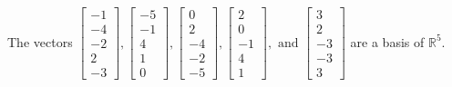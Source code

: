 \begin{exercise}
\begin{exerciseStatement}
  \end{exerciseStatement}
  \begin{exerciseAnswer}
   The vectors \(\left[\begin{array}{r}
-1 \\
-4 \\
-2 \\
2 \\
-3
\end{array}\right] , \left[\begin{array}{r}
-5 \\
-1 \\
4 \\
1 \\
0
\end{array}\right] , \left[\begin{array}{r}
0 \\
2 \\
-4 \\
-2 \\
-5
\end{array}\right] , \left[\begin{array}{r}
2 \\
0 \\
-1 \\
4 \\
1
\end{array}\right] , \text{ and } \left[\begin{array}{r}
3 \\
2 \\
-3 \\
-3 \\
3
\end{array}\right]\) 
  	 are  a basis of \(\mathbb{R}^5\).
  


  \end{exerciseAnswer}
\end{exercise}